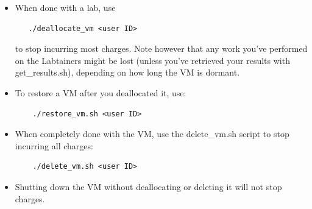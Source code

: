 \documentclass[12pt]{article}
\begin{document}
\begin{itemize}
\item When done with a lab, use
\begin{verbatim}
   ./deallocate_vm <user ID> 
\end{verbatim}
\noindent to stop incurring most charges.  Note however that any work you've performed on the Labtainers 
might be lost (unless you've retrieved your results with get\_results.sh), depending on how
long the VM is dormant.

\item To restore a VM after you deallocated it, use:
\begin{verbatim}
    ./restore_vm.sh <user ID>
\end{verbatim}

\item When completely done with the VM, use the delete\_vm.sh script to stop incurring all charges:
\begin{verbatim}
    ./delete_vm.sh <user ID>
\end{verbatim}

\item Shutting down the VM without deallocating or deleting it will not stop charges.
\end{itemize}
\end{document}
